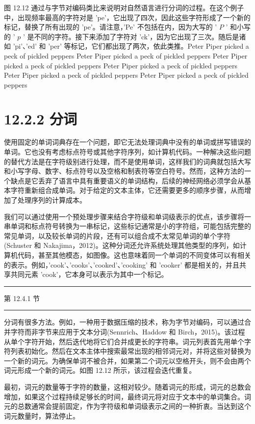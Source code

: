 \documentclass[10pt]{report}
\newcommand{\HRule}{\begin{center}\rule{0.9\linewidth}{0.2mm}\end{center}}
\begin{document}
图 12.12 通过与字节对编码类比来说明对自然语言进行分词的过程。在这个例子中，出现频率最高的字符对是 'pe'，它出现了四次，因此这些字符形成了一个新的标记，替换了所有出现的 'pe'。请注意，'Pe' 不包括在内，因为大写的 ’ \(P\) ’ 和小写的 ’ \(p\) ’ 是不同的字符。接下来添加了字符对 ’ck’，因为它出现了三次。随后是诸如 'pi'、'ed' 和 'per' 等标记，它们都出现了两次，依此类推。Peter Piper picked a peck of pickled peppers Peter Piper picked a peck of pickled peppers Peter Piper picked a peck of pickled peppers Peter Piper picked a peck of pickled peppers Peter Piper picked a peck of pickled peppers Peter Piper picked a peck of pickled peppers

\section*{12.2.2 分词}

使用固定的单词词典存在一个问题，即它无法处理词典中没有的单词或拼写错误的单词。它也没有考虑标点符号或其他字符序列，如计算机代码。一种解决这些问题的替代方法是在字符级别进行处理，而不是使用单词，这样我们的词典就包括大写和小写字母、数字、标点符号以及空格和制表符等空白符号。然而，这种方法的一个缺点是它丢弃了语言中具有重要语义的单词结构，后续的神经网络必须学会从基本字符重新组合成单词。对于给定的文本主体，它还需要更多的顺序步骤，从而增加了处理序列的计算成本。

我们可以通过使用一个预处理步骤来结合字符级和单词级表示的优点，该步骤将一串单词和标点符号转换为一串标记，这些标记通常是小的字符组，可能包括完整的常见单词，以及较长单词的片段，还有可以组合成不太常见单词的单个字符(Schuster 和 Nakajima，2012)。这种分词还允许系统处理其他类型的序列，如计算机代码，甚至其他模态，如图像。这也意味着同一个单词的不同变体可以有相关的表示。例如，'cook'、'cooks'、'cooked'、'cooking' 和 'cooker' 都是相关的，并且共享共同元素 'cook'，它本身可以表示为其中一个标记。

\HRule

第 12.4.1 节

\HRule

分词有很多方法。例如，一种用于数据压缩的技术，称为字节对编码，可以通过合并字符而非字节来应用于文本分词(Sennrich、Haddow 和 Birch，2015)。该过程从单个字符开始，然后迭代地将它们合并成更长的字符串。词元列表首先用单个字符列表初始化。然后在文本主体中搜索最常出现的相邻词元对，并将这些对替换为一个新的词元。为确保单词不被合并，如果第二个词元以空格开头，则不会由两个词元形成一个新的词元。如图 12.12 所示，该过程会迭代重复。

最初，词元的数量等于字符的数量，这相对较少。随着词元的形成，词元的总数会增加，如果这个过程持续足够长的时间，最终词元将对应于文本中的单词集合。词元的总数通常会提前固定，作为字符级和单词级表示之间的一种折衷。当达到这个词元数量时，算法停止。
\end{document}
